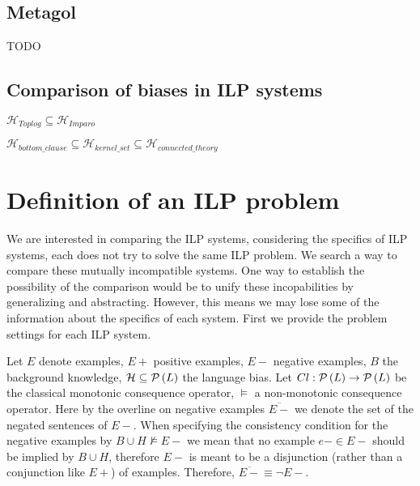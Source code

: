 \subsection{Metagol}
TODO


\subsection{Comparison of biases in ILP systems}
$\mathcal{H}_{Toplog} \subseteq \mathcal{H}_{Imparo}$

$\mathcal{H}_{bottom\_clause} \subseteq \mathcal{H}_{kernel\_set} \subseteq \mathcal{H}_{connected\_theory}$

\section{Definition of an ILP problem}
We are interested in comparing the ILP systems, considering the specifics of ILP systems, each does not try to solve the same ILP problem. We search a way to compare these mutually incompatible systems. One way to establish the possibility of the comparison would be to unify these incopabilities by generalizing and abstracting. However, this means we may lose some of the information about the specifics of each system. First we provide the problem settings for each ILP system.

Let $E$ denote examples, $E+$ positive examples, $E-$ negative examples, $B$ the background knowledge, $\mathcal{H} \subseteq \mathcal{P} \left({ L }\right)$ the language bias. Let $Cl:\mathcal{P} \left({ L }\right) \to \mathcal{P} \left({ L }\right)$ be the classical monotonic consequence operator, $\models$ a non-monotonic consequence operator. Here by the overline on negative examples $\overline{E-}$ we denote the set of the negated sentences of $E-$. When specifying the consistency condition for the negative examples by $B \cup H \not\models E-$ we mean that no example $e- \in E-$ should be implied by $B \cup H$, therefore $E-$ is meant to be a disjunction (rather than a conjunction like $E+$) of examples. Therefore, $\overline{E-} \equiv \neg E-$.

